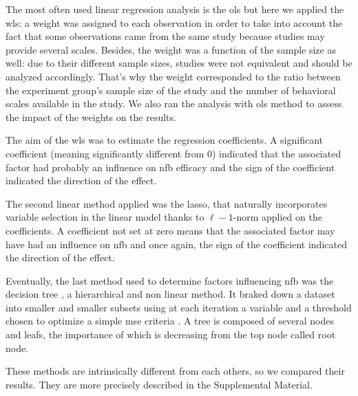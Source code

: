 The most often used linear regression analysis is the \gls{ols} but here we applied the \gls{wls}: a 
weight was assigned to each observation in order to take into account the fact that some observations came from the same study because studies 
may provide several scales. Besides, the weight was a function of the sample size as well: due to their different sample sizes,
studies were not equivalent and should be analyzed accordingly. That's why the weight corresponded to the ratio between the experiment group's sample size of the study and 
the number of behavioral scales available in the study. We also ran the analysis with \gls{ols} method to assess the impact of the weights on the results. 

The aim of the \gls{wls} was to estimate the regression coefficients. A significant coefficient (meaning significantly different from 0) indicated 
that the associated factor had probably an influence on \gls{nfb} efficacy and the sign of the coefficient indicated the direction of the effect.

The second linear method applied was the \gls{lasso}, that naturally incorporates variable selection 
in the linear model thanks to $\ell-1$-norm applied on the coefficients. A coefficient not set at zero means that 
the associated factor may have had an influence on \gls{nfb} and once again, the sign of the coefficient indicated the direction of the effect.

Eventually, the last method used to determine factors influencing \gls{nfb} was the decision tree \citep{Quinlan1986}, a hierarchical and non linear method.
It braked down a dataset into smaller and smaller subsets using at each iteration a variable and a threshold chosen to optimize a simple \gls{mse} 
criteria \citep{James2013}. A tree is composed of several nodes and leafs, the importance of which is decreasing from the top node called root node. 

These methods are intrinsically different from each others, so we compared their results. They are more precisely described in the Supplemental Material.















